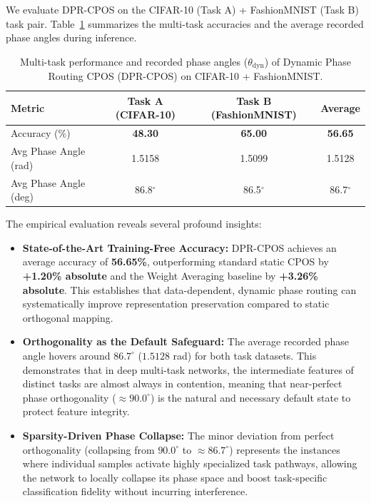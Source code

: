 \documentclass{article}
\theoremstyle{plain}
\theoremstyle{definition}
\theoremstyle{remark}
\begin{document}
We evaluate DPR-CPOS on the CIFAR-10 (Task A) + FashionMNIST (Task B) task pair. Table~\ref{tab:dpr_cpos} summarizes the multi-task accuracies and the average recorded phase angles during inference.

\begin{table}[h]
\caption{Multi-task performance and recorded phase angles ($\theta_{\text{dyn}}$) of Dynamic Phase Routing CPOS (DPR-CPOS) on CIFAR-10 + FashionMNIST.}
\label{tab:dpr_cpos}
\begin{center}
\begin{small}
\begin{sc}
\begin{tabular}{lccc}
\toprule
Metric & Task A (CIFAR-10) & Task B (FashionMNIST) & Average \\
\midrule
Accuracy (\%) & \textbf{48.30} & \textbf{65.00} & \textbf{56.65} \\
Avg Phase Angle (rad) & 1.5158 & 1.5099 & 1.5128 \\
Avg Phase Angle (deg) & 86.8$^\circ$ & 86.5$^\circ$ & 86.7$^\circ$ \\
\bottomrule
\end{tabular}
\end{sc}
\end{small}
\end{center}
\end{table}

The empirical evaluation reveals several profound insights:
\begin{itemize}
\item \textbf{State-of-the-Art Training-Free Accuracy:} DPR-CPOS achieves an average accuracy of \textbf{56.65\%}, outperforming standard static CPOS by \textbf{+1.20\% absolute} and the Weight Averaging baseline by \textbf{+3.26\% absolute}. This establishes that data-dependent, dynamic phase routing can systematically improve representation preservation compared to static orthogonal mapping.
\item \textbf{Orthogonality as the Default Safeguard:} The average recorded phase angle hovers around $86.7^\circ$ ($1.5128$ rad) for both task datasets. This demonstrates that in deep multi-task networks, the intermediate features of distinct tasks are almost always in contention, meaning that near-perfect phase orthogonality ($\approx 90.0^\circ$) is the natural and necessary default state to protect feature integrity.
\item \textbf{Sparsity-Driven Phase Collapse:} The minor deviation from perfect orthogonality (collapsing from $90.0^\circ$ to $\approx 86.7^\circ$) represents the instances where individual samples activate highly specialized task pathways, allowing the network to locally collapse its phase space and boost task-specific classification fidelity without incurring interference.
\end{itemize}
\end{document}

